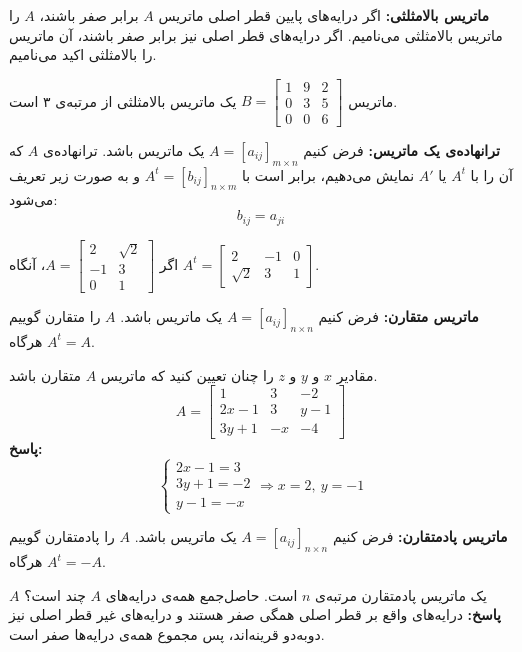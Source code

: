 \smallskip
\textbf{ماتریس بالامثلثی:}
اگر درایه‌های پایین قطر اصلی ماتریس $A$ برابر صفر باشند، $A$ را ماتریس بالامثلثی می‌نامیم. اگر درایه‌های قطر اصلی نیز برابر صفر باشند، آن ماتریس را بالامثلثی اکید می‌نامیم.
\begin{example}
	ماتریس
	$
	B = \begin{bmatrix}
		1 & 9 & 2 \\
		0 & 3 & 5 \\
		0 & 0 & 6
	\end{bmatrix}
	$
	یک ماتریس بالامثلثی از مرتبه‌ی ۳ است.
\end{example}
\smallskip
\textbf{ترانهاده‌ی یک ماتریس:}
فرض کنیم
$A=[a_{ij}]_{m \times n}$
یک ماتریس باشد. ترانهاده‌ی $A$ که آن را با $A^t$ یا $A'$ نمایش می‌دهیم، برابر است با
$A^t=[b_{ij}]_{n \times m}$
و به صورت زیر تعریف می‌شود:
$$b_{ij} = a_{ji}$$

\begin{example}
	اگر
	$
	A = \begin{bmatrix}
		2 & \sqrt{2} \\
		-1 & 3 \\
		0 & 1
	\end{bmatrix}
	$،
	آنگاه
	$
	A^t = \begin{bmatrix}
		2 & -1 & 0 \\
		\sqrt{2} & 3 & 1
	\end{bmatrix}
	$.
\end{example}
\smallskip
\textbf{ماتریس متقارن:}
فرض کنیم
$A=[a_{ij}]_{n \times n}$
یک ماتریس باشد. $A$ را متقارن گوییم هرگاه
$A^t=A$.

\begin{example}
	مقادیر $x$ و $y$ و $z$ را چنان تعیین کنید که ماتریس $A$ متقارن باشد.
	\[
	A = \begin{bmatrix}
		1 & 3 & -2 \\
		2x-1 & 3 & y-1 \\
		3y+1 & -x & -4
	\end{bmatrix}
	\]
	\textbf{پاسخ:}
	\[
	\begin{cases}
	2x-1 = 3 \\
	3y+1 = -2 \\
	y-1 = -x
	\end{cases}
	\Rightarrow
	x=2 ,\: y=-1
	\]
	
\end{example}
\smallskip
\textbf{ماتریس پادمتقارن:}
فرض کنیم
$A=[a_{ij}]_{n \times n}$
یک ماتریس باشد. $A$ را پادمتقارن گوییم هرگاه
$A^t=-A$.

\begin{example}
	$A$
	یک ماتریس پادمتقارن مرتبه‌ی $n$ است. حاصل‌جمع همه‌ی درایه‌های $A$ چند است؟ \\
	\textbf{پاسخ:}
	درایه‌‌های واقع بر قطر اصلی همگی صفر هستند و درایه‌های غیر قطر اصلی نیز دوبه‌دو قرینه‌اند، پس مجموع همه‌ی درایه‌ها صفر است.
\end{example}

